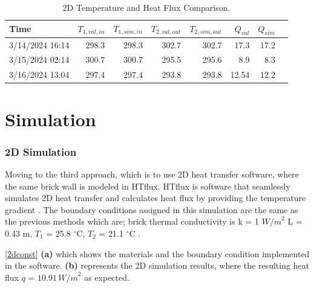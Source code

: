 \begin{table}[tb]
    \caption{2D Temperature and Heat Flux Comparison.}
    \label{table2d}
    \centering
    \begin{tabular}{lrrrrrrr}
        \toprule
        Time                & $T_{1,val,in}$ & $T_{1,sim,in}$ & $T_{2,val,out}$& $T_{2,sim,out}$ & $Q_{val}$ & $Q_{sim}$ \\
        \midrule
        3/14/2024 16:14 & 298.3    & 298.3    & 302.7     & 302.7     & 17.3 & 17.2 \\
        3/15/2024 02:14  & 300.7    & 300.7   & 295.5    & 295.6     & 8.9  & 8.3  \\
        3/16/2024 13:04 & 297.4  & 297.4   & 293.8   & 293.8   & 12.54 & 12.2  \\
        \bottomrule
    \end{tabular}
   
\end{table}

















\section{Simulation}
\subsubsection{2D Simulation}
Moving to the third approach, which is to use 2D heat transfer software, where the same brick wall is modeled in HTflux. 
HTflux is  software that seamlessly simulates 2D heat transfer and calculates heat flux by providing the temperature gradient \cite{HTflux}. 
The boundary conditions assigned in this simulation are the same as the previous methods which are; brick thermal conductivity is k = 1 ${W/m}^2$ L = 0.43 m,
$T_1$ = 25.8 $^\circ \text{C}$, 
$T_2$  = 21.1  $^\circ \text{C}$ .


 \ref{2dconst} \textbf{(a)} which shows the materials and the boundary condition implemented in the software. \textbf{(b)} represents the 2D simulation results, where the resulting heat flux \( q \) = \( 10.91 \, {W/m}^2 \) as expected.










